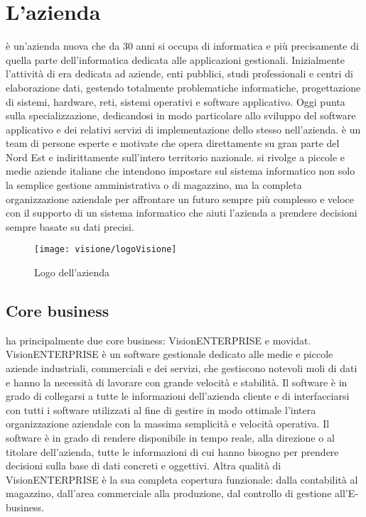 \section{L'azienda}

\visione{} è un'azienda nuova che da 30 anni si occupa di informatica e più precisamente di quella parte dell'informatica dedicata alle applicazioni gestionali. Inizialmente l'attività di \visione{} era dedicata ad aziende, enti pubblici, studi professionali e centri di elaborazione dati, gestendo totalmente problematiche informatiche, progettazione di sistemi, hardware, reti, sistemi operativi e software applicativo. Oggi \visione{} punta sulla specializzazione, dedicandosi in modo particolare allo sviluppo del software applicativo e dei relativi servizi di implementazione dello stesso nell'azienda. \visione{} è un team di persone esperte e motivate che opera direttamente su gran parte del Nord Est e indirittamente sull’intero territorio nazionale. \visione{} si rivolge a piccole e medie aziende italiane che intendono impostare sul sistema informatico non solo la semplice gestione amministrativa o di magazzino, ma la completa organizzazione aziendale per affrontare un futuro sempre più complesso e veloce con il supporto di un sistema informatico che aiuti l’azienda a prendere decisioni sempre basate su dati precisi.

\begin{figure}[!h] 
    \centering 
    \texttt{[image: visione/logoVisione]} 
    \caption{Logo dell'azienda \visione{}}
\end{figure}

\subsection{Core business}

\visione{} ha principalmente due core business: VisionENTERPRISE e movidat. VisionENTERPRISE è un software gestionale  dedicato alle medie e piccole aziende industriali, commerciali e dei servizi, che gestiscono notevoli moli di dati e hanno la necessità di lavorare con grande velocità e stabilità. Il software è in grado di collegarsi a tutte le informazioni dell'azienda cliente e di interfacciarsi con tutti i software utilizzati al fine di gestire in modo ottimale l'intera organizzazione aziendale con la massima semplicità e velocità operativa. Il software è in grado di rendere disponibile in tempo reale, alla direzione o al titolare dell'azienda, tutte le informazioni di cui hanno bisogno per prendere decisioni sulla base di dati concreti e oggettivi. Altra qualità di VisionENTERPRISE è la sua completa copertura funzionale: dalla contabilità al magazzino, dall'area commerciale alla produzione, dal controllo di gestione all'E-business.

